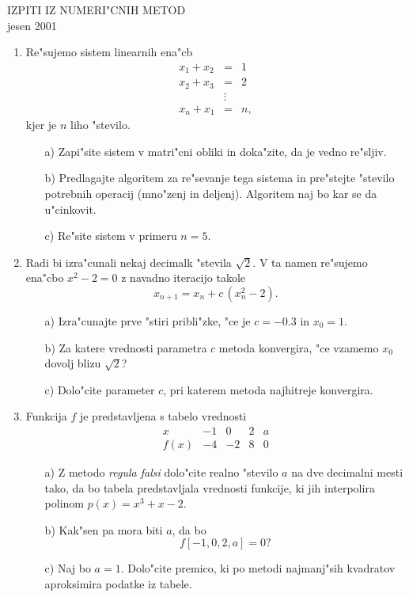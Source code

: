 
\begin{center}
  IZPITI IZ NUMERI"CNIH METOD\\
  jesen 2001
\end{center}
\begin{enumerate}
 \item Re"sujemo sistem linearnih ena"cb
    \begin{eqnarray*}
      x_1+x_2 &=& 1\\
      x_2+x_3 &=& 2\\
              &\vdots&\\
      x_n+x_1 &=& n,
    \end{eqnarray*}
    kjer je $n$ liho "stevilo.
 \begin{itemize}
    \item[a)] Zapi"site sistem v matri"cni obliki in doka"zite,
      da je vedno re"sljiv.
    \item[b)] Predlagajte algoritem za re"sevanje tega sistema in
      pre"stejte "stevilo potrebnih operacij (mno"zenj in deljenj).
      Algoritem naj bo kar se da u"cinkovit.
    \item[c)] Re"site sistem v primeru $n=5$.
 \end{itemize}

 \item Radi bi izra"cunali nekaj decimalk "stevila 
        $\sqrt{2}$. V ta namen re"sujemo ena"cbo $x^2-2=0$
        z navadno iteracijo takole
        $$x_{n+1}=x_n+c\,(x_n^2-2).$$
 \begin{itemize}
      \item[a)] Izra"cunajte prve "stiri pribli"zke, "ce je
        $c=-0.3$ in $x_0=1$.
      \item[b)] Za katere vrednosti parametra $c$ metoda 
        konvergira, "ce vzamemo $x_0$ dovolj blizu $\sqrt{2}$?
      \item[c)] Dolo"cite parameter $c$, pri katerem metoda 
        najhitreje konvergira.
 \end{itemize}

 \item Funkcija $f$ je predstavljena s tabelo vrednosti
    $$
    \begin{array}{c|cccc}
      x&-1&0&2&a\\
      \hline
      f(x)&-4&-2&8&0
    \end{array}
    $$
  \begin{itemize}
     \item[a)] Z metodo {\sl regula falsi} dolo"cite realno "stevilo
      $a$ na dve decimalni mesti tako, da bo tabela predstavljala
      vrednosti funkcije, ki jih interpolira polinom
      $p(x)=x^3+x-2$.
     \item[b)] Kak"sen pa mora biti $a$, da bo 
      $$f[-1,0,2,a]=0?$$
     \item[c)] Naj bo $a=1$. Dolo"cite premico, ki po metodi
      najmanj"sih kvadratov aproksimira podatke iz tabele.
  \end{itemize}


\end{enumerate}
